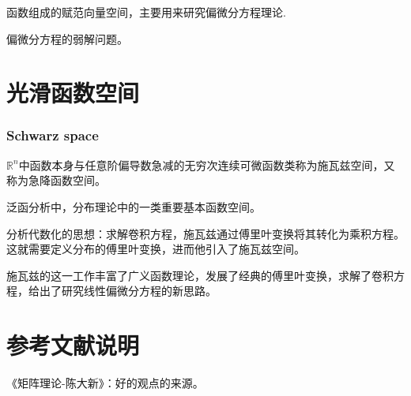 \documentclass[UTF8]{../../09-Mathematics}
\begin{document}
函数组成的赋范向量空间，主要用来研究偏微分方程理论. 

偏微分方程的弱解问题。



\chapter{光滑函数空间}


\subsection{Schwarz space}

$\mathbb R^n$中函数本身与任意阶偏导数急减的无穷次连续可微函数类称为施瓦兹空间，又称为急降函数空间。

泛函分析中，分布理论中的一类重要基本函数空间。


分析代数化的思想：求解卷积方程，施瓦兹通过傅里叶变换将其转化为乘积方程。这就需要定义分布的傅里叶变换，进而他引入了施瓦兹空间。

施瓦兹的这一工作丰富了广义函数理论，发展了经典的傅里叶变换，求解了卷积方程，给出了研究线性偏微分方程的新思路。






\chapter{参考文献说明}
《矩阵理论-陈大新》：好的观点的来源。


\end{document}
